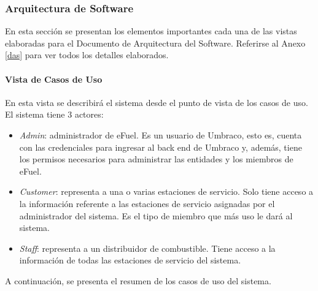 \subsubsection{Arquitectura de Software}
En esta sección se presentan los elementos importantes cada una de las vistas elaboradas para el Documento de Arquitectura del Software. Referirse al Anexo \ref{das} para ver todos los detalles elaborados.

\paragraph{Vista de Casos de Uso} En esta vista se describirá el sistema desde el punto de vista de los casos de uso. El sistema tiene 3 actores:

\begin{itemize}
    \item \emph{Admin}: administrador de eFuel. Es un usuario de Umbraco, esto es, cuenta con las credenciales para ingresar al back end de Umbraco y, además, tiene los permisos necesarios para administrar las entidades y los miembros de eFuel.
    \item \emph{Customer}: representa a una o varias estaciones de servicio. Solo tiene acceso a la información referente a las estaciones de servicio asignadas por el administrador del sistema. Es el tipo de miembro que más uso le dará al sistema.
    \item \emph{Staff}: representa a un distribuidor de combustible. Tiene acceso a la información de todas las estaciones de servicio del sistema.
\end{itemize}

A continuación, se presenta el resumen de los casos de uso del sistema.

\newcommand\rownumber{\stepcounter{magicrownumbers}\arabic{magicrownumbers}}

